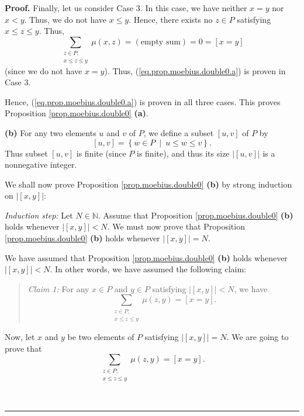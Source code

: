 \documentclass[numbers=enddot,12pt,final,onecolumn,notitlepage]{scrartcl}%
\theoremstyle{definition}
\newenvironment{statement}{\begin{quote}}{\end{quote}}
\newenvironment{proof}[1][Proof]{\noindent\textbf{#1.} }{\ \rule{0.5em}{0.5em}}
\newenvironment{vershort}{}{}
\let\sumnonlimits\sum
\renewcommand{\sum}{\sumnonlimits\limits}
\begin{document}
\begin{vershort}
\begin{proof}
Finally, let us consider Case 3. In this case, we have neither $x=y$ nor
$x<y$. Thus, we do not have $x\leq y$. Hence, there exists no $z\in P$
satisfying $x\leq z\leq y$. Thus,
\[
\sum_{\substack{z\in P;\\x\leq z\leq y}}\mu\left(  x,z\right)  =\left(
\text{empty sum}\right)  =0=\left[  x=y\right]
\]
(since we do not have $x=y$). Thus, (\ref{eq.prop.moebius.double0.a}) is
proven in Case 3.

Hence, (\ref{eq.prop.moebius.double0.a}) is proven in all three cases. This
proves Proposition \ref{prop.moebius.double0} \textbf{(a)}.

\textbf{(b)} For any two elements $u$ and $v$ of $P$, we define a subset
$\left[  u,v\right]  $ of $P$ by%
\[
\left[  u,v\right]  =\left\{  w\in P\ \mid\ u\leq w\leq v\right\}  .
\]
Thus subset $\left[  u,v\right]  $ is finite (since $P$ is finite), and thus
its size $\left\vert \left[  u,v\right]  \right\vert $ is a nonnegative integer.

We shall now prove Proposition \ref{prop.moebius.double0} \textbf{(b)} by
strong induction on $\left\vert \left[  x,y\right]  \right\vert $:

\textit{Induction step:} Let $N\in\mathbb{N}$. Assume that Proposition
\ref{prop.moebius.double0} \textbf{(b)} holds whenever $\left\vert \left[
x,y\right]  \right\vert <N$. We must now prove that Proposition
\ref{prop.moebius.double0} \textbf{(b)} holds whenever $\left\vert \left[
x,y\right]  \right\vert =N$.

We have assumed that Proposition \ref{prop.moebius.double0} \textbf{(b)} holds
whenever $\left\vert \left[  x,y\right]  \right\vert <N$. In other words, we
have assumed the following claim:

\begin{statement}
\textit{Claim 1:} For any $x\in P$ and $y\in P$ satisfying $\left\vert \left[
x,y\right]  \right\vert <N$, we have%
\[
\sum_{\substack{z\in P;\\x\leq z\leq y}}\mu\left(  z,y\right)  =\left[
x=y\right]  .
\]

\end{statement}

Now, let $x$ and $y$ be two elements of $P$ satisfying $\left\vert \left[
x,y\right]  \right\vert =N$. We are going to prove that%
\begin{equation}
\sum_{\substack{z\in P;\\x\leq z\leq y}}\mu\left(  z,y\right)  =\left[
x=y\right]  . \label{pf.prop.moebius.double0.short.b.goal}%
\end{equation}



\end{proof}
\end{vershort}
\end{document}
